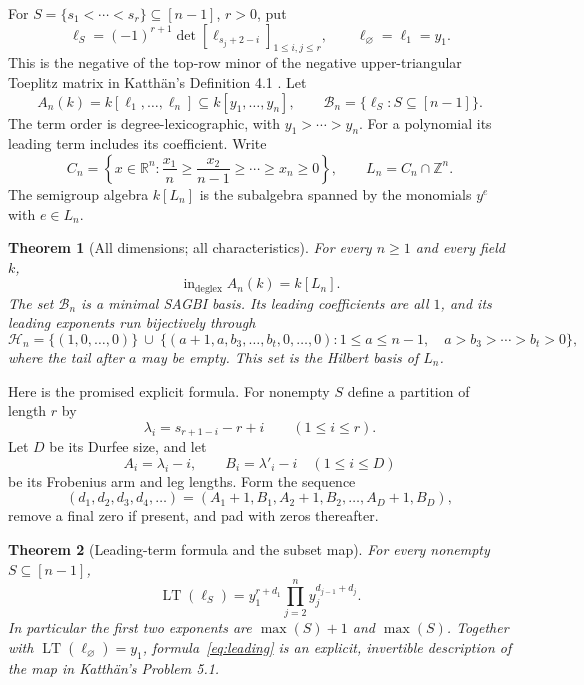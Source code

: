 \documentclass[11pt]{article}
\newtheorem{theorem}{Theorem}[section]
\theoremstyle{definition}
\theoremstyle{remark}
\newcommand{\Z}{\mathbb Z}
\newcommand{\LT}{\operatorname{LT}}
\newcommand{\inA}{\operatorname{in}}
\begin{document}
For $S=\{s_1<\cdots<s_r\}\subseteq[n-1]$, $r>0$, put
\begin{equation}\label{eq:minor}
 \ell_S=(-1)^{r+1}\det[\ell_{s_j+2-i}]_{1\le i,j\le r},
 \qquad \ell_\varnothing=\ell_1=y_1.
\end{equation}
This is the negative of the top-row minor of the negative upper-triangular
Toeplitz matrix in Katth\"an's Definition 4.1 \cite{Katthan}.
Let
\[
 A_n(k)=k[\ell_1,\ldots,\ell_n]\subseteq k[y_1,\ldots,y_n],\qquad
 \mathcal B_n=\{\ell_S:S\subseteq[n-1]\}.
\]
The term order is degree-lexicographic, with $y_1>\cdots>y_n$.
For a polynomial its leading term includes its coefficient.
Write
\begin{equation}\label{eq:cone}
 C_n=\left\{x\in\mathbb R^n:
 \frac{x_1}{n}\ge\frac{x_2}{n-1}\ge\cdots\ge x_n\ge0\right\},
 \qquad L_n=C_n\cap\Z^n.
\end{equation}
The semigroup algebra $k[L_n]$ is the subalgebra spanned by the monomials
$y^e$ with $e\in L_n$.

\begin{theorem}[All dimensions; all characteristics]\label{thm:main}
For every $n\ge1$ and every field $k$,
\[
 \inA_{\mathrm{deglex}}A_n(k)=k[L_n].
\]
The set $\mathcal B_n$ is a minimal SAGBI basis. Its leading coefficients
are all $1$, and its leading exponents run bijectively through
\begin{equation}\label{eq:hilbert}
 \mathcal H_n=\{(1,0,\ldots,0)\}\ \cup\
 \{(a+1,a,b_3,\ldots,b_t,0,\ldots,0):
 1\le a\le n-1,\quad a>b_3>\cdots>b_t>0\},
\end{equation}
where the tail after $a$ may be empty. This set is the Hilbert basis of $L_n$.
\end{theorem}

Here is the promised explicit formula. For nonempty $S$ define a partition
of length $r$ by
\begin{equation}\label{eq:lambda}
 \lambda_i=s_{r+1-i}-r+i\qquad(1\le i\le r).
\end{equation}
Let $D$ be its Durfee size, and let
\[
 A_i=\lambda_i-i,\qquad B_i=\lambda'_i-i\quad(1\le i\le D)
\]
be its Frobenius arm and leg lengths. Form the sequence
\begin{equation}\label{eq:profile}
 (d_1,d_2,d_3,d_4,\ldots)=(A_1+1,B_1,A_2+1,B_2,\ldots,A_D+1,B_D),
\end{equation}
remove a final zero if present, and pad with zeros thereafter.

\begin{theorem}[Leading-term formula and the subset map]\label{thm:formula}
For every nonempty $S\subseteq[n-1]$,
\begin{equation}\label{eq:leading}
 \LT(\ell_S)=y_1^{r+d_1}\prod_{j=2}^n y_j^{d_{j-1}+d_j}.
\end{equation}
In particular the first two exponents are $\max(S)+1$ and $\max(S)$.
Together with $\LT(\ell_\varnothing)=y_1$, formula~\eqref{eq:leading}
is an explicit, invertible description of the map in Katth\"an's
Problem 5.1.
\end{theorem}
\end{document}
